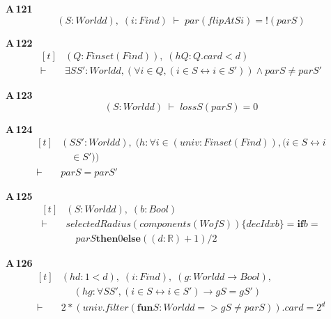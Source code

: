 \noindent\textbf{A\,121}\quad{}
{\footnotesize\[ (\mathit{S} : \mathit{World} \mathit{d}),\; (\mathit{i} : \mathit{Fin} \mathit{d}) \;\vdash\; \mathit{par} (\mathit{flipAt} \mathit{S} \mathit{i}) = !(\mathit{par} \mathit{S}) \]}

\noindent\textbf{A\,122}\quad{}
{\footnotesize\[ \begin{aligned}[t]
&(\mathit{Q} : \mathit{Finset} (\mathit{Fin} \mathit{d})),\; (\mathit{hQ} : \mathit{Q}.\mathit{card} < \mathit{d})\\
\vdash\;&\exists \mathit{S} \mathit{S'} : \mathit{World} \mathit{d}, (\forall \mathit{i} \in \mathit{Q}, (\mathit{i} \in \mathit{S} \leftrightarrow \mathit{i} \in \mathit{S'})) \wedge \mathit{par} \mathit{S} \neq \mathit{par} \mathit{S'}
\end{aligned} \]}

\noindent\textbf{A\,123}\quad{}
{\footnotesize\[ (\mathit{S} : \mathit{World} \mathit{d}) \;\vdash\; \mathit{loss} \mathit{S} (\mathit{par} \mathit{S}) = 0 \]}

\noindent\textbf{A\,124}\quad{}
{\footnotesize\[ \begin{aligned}[t]
&(\mathit{S} \mathit{S'} : \mathit{World} \mathit{d}),\; (\mathit{h} : \forall \mathit{i} \in (\mathit{univ} : \mathit{Finset} (\mathit{Fin} \mathit{d})), (\mathit{i} \in \mathit{S} \leftrightarrow \mathit{i}\\
&\quad \in \mathit{S'}))\\
\vdash\;&\mathit{par} \mathit{S} = \mathit{par} \mathit{S'}
\end{aligned} \]}

\noindent\textbf{A\,125}\quad{}
{\footnotesize\[ \begin{aligned}[t]
&(\mathit{S} : \mathit{World} \mathit{d}),\; (\mathit{b} : \mathit{Bool})\\
\vdash\;&\mathit{selectedRadius} (\mathit{components} (\mathit{Wof} \mathit{S})) \{ \mathit{decIdx} \mathit{b}\} = \mathbf{if} \mathit{b} =\\
&\quad \mathit{par} \mathit{S} \mathbf{then} 0 \mathbf{else} ((\mathit{d} : \mathbb{R} ) + 1) / 2
\end{aligned} \]}

\noindent\textbf{A\,126}\quad{}
{\footnotesize\[ \begin{aligned}[t]
&(\mathit{hd} : 1 < \mathit{d}),\; (\mathit{i} : \mathit{Fin} \mathit{d}),\; (\mathit{g} : \mathit{World} \mathit{d} \to \mathit{Bool}),\\
&\quad \; (\mathit{hg} : \forall \mathit{S} \mathit{S'}, (\mathit{i} \in \mathit{S} \leftrightarrow \mathit{i} \in \mathit{S'}) \to \mathit{g} \mathit{S} = \mathit{g} \mathit{S'})\\
\vdash\;&2 * (\mathit{univ}.\mathit{filter} (\mathbf{fun} \mathit{S} : \mathit{World} \mathit{d} => \mathit{g} \mathit{S} \neq \mathit{par} \mathit{S})).\mathit{card} = 2 ^{\mathit{d}}
\end{aligned} \]}


